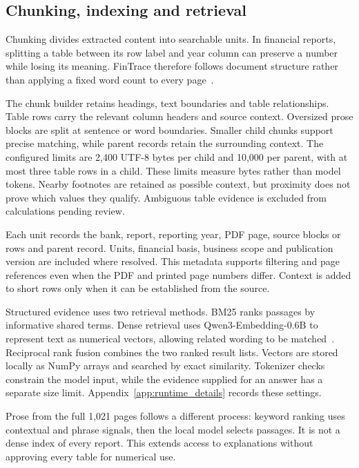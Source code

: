 \subsection{Chunking, indexing and retrieval}
\label{subsec:chunking_retrieval}

Chunking divides extracted content into searchable units. In financial reports, splitting a table between its row label and year column can preserve a number while losing its meaning. FinTrace therefore follows document structure rather than applying a fixed word count to every page~\cite{fintraceRetrieval2026}.

The chunk builder retains headings, text boundaries and table relationships. Table rows carry the relevant column headers and source context. Oversized prose blocks are split at sentence or word boundaries. Smaller child chunks support precise matching, while parent records retain the surrounding context. The configured limits are 2,400 UTF-8 bytes per child and 10,000 per parent, with at most three table rows in a child. These limits measure bytes rather than model tokens. Nearby footnotes are retained as possible context, but proximity does not prove which values they qualify. Ambiguous table evidence is excluded from calculations pending review.

Each unit records the bank, report, reporting year, PDF page, source blocks or rows and parent record. Units, financial basis, business scope and publication version are included where resolved. This metadata supports filtering and page references even when the PDF and printed page numbers differ. Context is added to short rows only when it can be established from the source.

Structured evidence uses two retrieval methods. BM25 ranks passages by informative shared terms. Dense retrieval uses Qwen3-Embedding-0.6B to represent text as numerical vectors, allowing related wording to be matched~\cite{qwenEmbedding}. Reciprocal rank fusion combines the two ranked result lists. Vectors are stored locally as NumPy arrays and searched by exact similarity. Tokenizer checks constrain the model input, while the evidence supplied for an answer has a separate size limit. Appendix~\ref{app:runtime_details} records these settings.

Prose from the full 1,021 pages follows a different process: keyword ranking uses contextual and phrase signals, then the local model selects passages. It is not a dense index of every report. This extends access to explanations without approving every table for numerical use.

